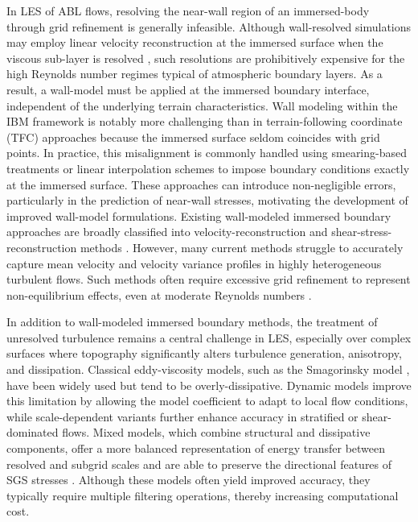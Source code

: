 \documentclass[%
superscriptaddress,
 amsmath,amssymb,
pra,
showkeys,
]{revtex4-2}
\begin{document}
In LES of ABL flows, resolving the near-wall region of an immersed-body through grid refinement is generally infeasible. Although wall-resolved simulations may employ linear velocity reconstruction at the immersed surface when the viscous sub-layer is resolved \cite{gilmanov2005hybrid,ge2007numerical,borazjani2008curvilinear}, such resolutions are prohibitively expensive for the high Reynolds number regimes typical of atmospheric boundary layers. As a result, a wall-model must be applied at the immersed boundary interface, independent of the underlying terrain characteristics. Wall modeling within the IBM framework is notably more challenging than in terrain-following coordinate (TFC) approaches because the immersed surface seldom coincides with grid points. In practice, this misalignment is commonly handled using smearing-based treatments \cite{diebold2013flow,fang2016intercomparison} or linear interpolation schemes to impose boundary conditions exactly at the immersed surface. These approaches can introduce non-negligible errors, particularly in the prediction of near-wall stresses, motivating the development of improved wall-model formulations. Existing wall-modeled immersed boundary approaches are broadly classified into velocity-reconstruction and shear-stress-reconstruction methods \cite{chester2007modeling,liu2020wall}. However, many current methods struggle to accurately capture mean velocity and velocity variance profiles in highly heterogeneous turbulent flows. Such methods often require excessive grid refinement to represent non-equilibrium effects, even at moderate Reynolds numbers \cite{diebold2013flow,liu2020wall}. %

In addition to wall-modeled immersed boundary methods, the treatment of unresolved turbulence remains a central challenge in LES, especially over complex surfaces where topography significantly alters turbulence generation, anisotropy, and dissipation. Classical eddy-viscosity models, such as the Smagorinsky model \citep{smagorinsky1963general}, have been widely used but tend to be overly-dissipative. Dynamic models \citep{germano1991dynamic} improve this limitation by allowing the model coefficient to adapt to local flow conditions, while scale-dependent variants \citep{porte2000scale,bou2005scale} further enhance accuracy in stratified or shear-dominated flows. Mixed models, which combine structural and dissipative components, offer a more balanced representation of energy transfer between resolved and subgrid scales and are able to preserve the directional features of SGS stresses \cite{bardina1983improved,vreman1994formulation,horiuti1997new}. Although these models often yield improved accuracy, they typically require multiple filtering operations, thereby increasing computational cost.
\end{document}
